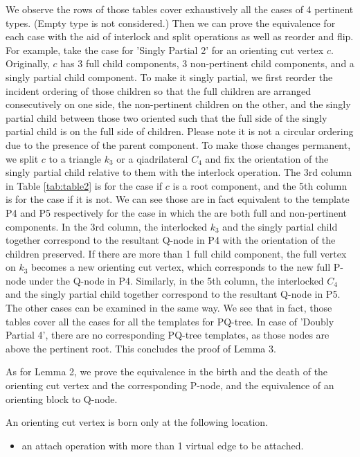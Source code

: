 \documentclass[a4]{jgaa-art}
\begin{document}
\begin{appendices}
   We observe the rows of those tables cover exhaustively all the cases of 4 pertinent types. (Empty type
   is not considered.)
   Then we can prove the equivalence for each case with the aid of interlock and split operations
   as well as reorder and flip.
   For example, take the case for 'Singly Partial 2' for an orienting cut vertex $c$.
   Originally, $c$
   has 3 full child components, 3 non-pertinent child components, and a singly partial child component.
   To make it singly partial, we first reorder the incident ordering of those children so that
   the full children are arranged consecutively on one side, the non-pertinent children on the other,
   and the singly partial child between those two oriented such that the full side of the singly partial
   child is on the full side of children. Please note it is not a circular ordering due to the presence
   of the parent component.
   To make those changes permanent, we split $c$
   to a triangle $k_3$ or a qiadrilateral $C_4$ and fix the orientation of the singly partial child
   relative to them with the interlock operation. The 3rd column in Table \ref{tab:table2} is for the case
   if $c$ is a root component, and the 5th column is for the case if it is not.
   We can see those are in fact equivalent to the template P4 and P5 respectively for the case in which
   the are both full and non-pertinent components.
   In the 3rd column, the interlocked $k_3$ and the singly partial child together correspond to 
   the resultant Q-node in P4 with the orientation of the children preserved. If there are more than 1
   full child component, the full vertex on $k_3$ becomes a new orienting cut vertex, which corresponds
   to the new full P-node under the Q-node in P4.  Similarly, in the 5th column, the interlocked $C_4$
   and the singly partial child together correspond to the resultant Q-node in P5.
   The other cases can be examined in the same way.
   We see that in fact, those tables cover all the cases for all the templates for PQ-tree.
    In case of 'Doubly Partial 4', there are no corresponding PQ-tree templates, as those nodes are above the 
   pertinent root.
   This concludes the proof of Lemma 3.

   As for Lemma 2, we prove the equivalence in the birth and the death of the orienting cut vertex
   and the corresponding P-node, and the equivalence of an orienting block to Q-node.

   An orienting cut vertex is born only at the following location.
   \begin{itemize}
   \item an attach operation with more than 1 virtual edge to be attached.
   \end{itemize}


\end{appendices}
\end{document}
